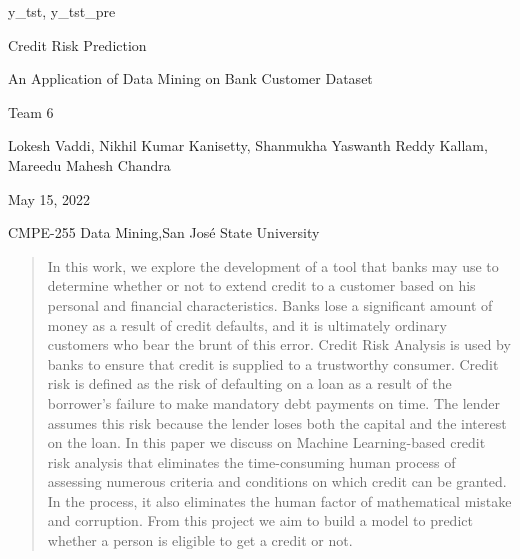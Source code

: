 y_tst, y_tst_pre\documentclass[12pt]{article}
\newcommand\titleofdoc{Credit Risk Prediction} %
\newcommand\GroupName{Team 6} %
\begin{document}
\begin{titlepage}
   \begin{center}
        \vspace*{4cm} %

        \Huge{\titleofdoc} 

        \vspace{0.5cm}
        \LARGE{An Application of Data Mining on Bank Customer Dataset}
            
        \vspace{3 cm}
        \Large{\GroupName}
       
        \vspace{0.25cm}
        \large{Lokesh Vaddi, Nikhil Kumar Kanisetty, Shanmukha Yaswanth Reddy Kallam, Mareedu Mahesh Chandra}
       
        \vspace{3 cm}
        \Large{May 15, 2022}
        
        \vspace{0.25 cm}
        \Large{CMPE-255 Data Mining,San José State University}
       

       \vfill
    \end{center}
\end{titlepage}

\setcounter{page}{2}
\pagestyle{fancy}
\fancyhf{}
\rhead{\thepage}
\lhead{\GroupName; \titleofdoc}


\begin{abstract}

In this work, we explore the development of a tool that banks may use to determine whether or not to extend credit to a customer based on his personal and financial characteristics. Banks lose a significant amount of money as a result of credit defaults, and it is ultimately ordinary customers who bear the brunt of this error. Credit Risk Analysis is used by banks to ensure that credit is supplied to a trustworthy consumer. Credit risk is defined as the risk of defaulting on a loan as a result of the borrower's failure to make mandatory debt payments on time. The lender assumes this risk because the lender loses both the capital and the interest on the loan. In this paper we discuss on Machine Learning-based credit risk analysis that eliminates the time-consuming human process of assessing numerous criteria and conditions on which credit can be granted. In the process, it also eliminates the human factor of mathematical mistake and corruption. From this project we aim to build a model to predict whether a person is eligible to get a credit or not. 

\end{abstract}
\end{document}
